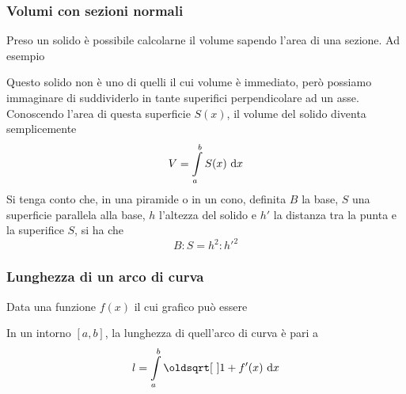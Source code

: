 \subsubsection{Volumi con sezioni normali}
Preso un solido è possibile calcolarne il volume sapendo l'area di una sezione. Ad esempio
\begin{center}
\end{center}
Questo solido non è uno di quelli il cui volume è immediato, però possiamo immaginare di 
suddividerlo in tante superifici perpendicolare ad un asse. Conoscendo l'area di questa
superficie $S(x)$, il volume del solido diventa semplicemente
\begin{equation*}
  V = \int\limits_{a}^{b} S(x)\,\mathop{}\!\mathrm{d} x
\end{equation*}
Si tenga conto che, in una piramide o in un cono, definita $B$ la base, $S$ una superficie 
parallela alla base, $h$ l'altezza del solido e $h'$ la distanza tra la punta e la superifice $S$,
si ha che
\begin{equation*}
  B:S=h^2:h'^2
\end{equation*}

\subsubsection{Lunghezza di un arco di curva}
Data una funzione $f(x)$ il cui grafico può essere
\begin{center}
\end{center}
In un intorno ${[a,b]}$, la lunghezza di quell'arco di curva è pari a
\begin{equation*}
  l = \int\limits_{a}^{b} \sqrt{1+f'(x)}\,\dif x
\end{equation*}

